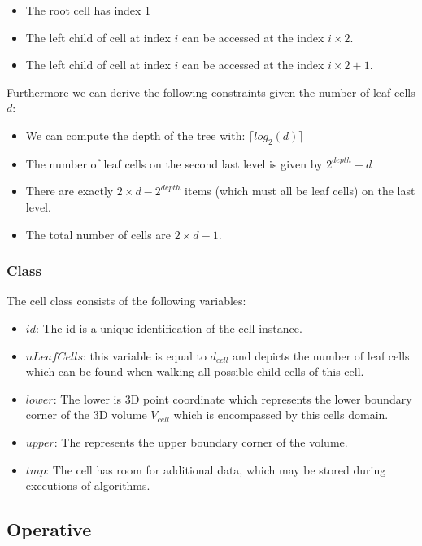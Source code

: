 \documentclass[]{article}
\begin{document}
\begin{itemize}
	\item The root cell has index 1
	\item The left child of cell at index $i$ can be accessed at the index $i\times2$. 
	\item The left child of cell at index $i$ can be accessed at the index $i\times2 + 1$. 
\end{itemize}

\vspace{0.5cm}
Furthermore we can derive the following constraints given the number of leaf cells $d$:

\begin{itemize}
	\item We can compute the depth of the tree with: $\lceil log_2(d) \rceil$
	\item The number of leaf cells on the second last level is given by $2^{depth} - d$ 
	\item There are exactly $2 \times d - 2^{depth}$ items (which must all be leaf cells) on the last level. 
	\item The total number of cells are $2\times d - 1$.
\end{itemize}

\subsubsection{Class}
The cell class consists of the following variables:

\begin{itemize}
	\item $id$: The id is a unique identification of the cell instance.
	\item $nLeafCells$: this variable is equal to $d_{cell}$ and depicts the number of leaf cells which can be found when walking all possible child cells of this cell. 
	\item $lower$: The lower is 3D point coordinate which represents the lower boundary corner of the 3D volume $V_{cell}$ which is encompassed by this cells domain.
	\item $upper$: The represents the upper boundary corner of the volume.	
	\item $tmp$: The cell has room for additional data, which may be stored during executions of algorithms. 
\end{itemize}

\subsection{Operative}
\end{document}
